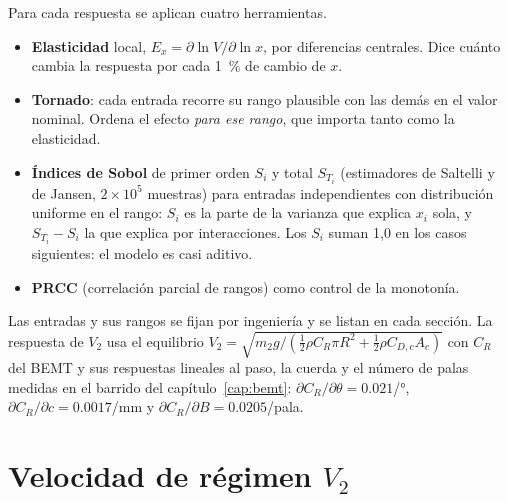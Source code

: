 Para cada respuesta se aplican cuatro herramientas.
\begin{itemize}[leftmargin=*]
  \item \textbf{Elasticidad} local, $E_x=\partial\ln V/\partial\ln x$, por diferencias
        centrales. Dice cuánto cambia la respuesta por cada \SI{1}{\percent} de cambio de $x$.
  \item \textbf{Tornado}: cada entrada recorre su rango plausible con las demás en el valor
        nominal. Ordena el efecto \emph{para ese rango}, que importa tanto como la
        elasticidad.
  \item \textbf{Índices de Sobol} de primer orden $S_i$ y total $S_{T_i}$ (estimadores de
        Saltelli y de Jansen, $2\times10^5$ muestras) para entradas independientes con distribución
        uniforme en el rango: $S_i$ es la parte de la varianza que explica $x_i$ sola, y
        $S_{T_i}-S_i$ la que explica por interacciones. Los $S_i$ suman 1,0 en los casos
        siguientes: el modelo es casi aditivo.
  \item \textbf{PRCC} (correlación parcial de rangos) como control de la monotonía.
\end{itemize}
Las entradas y sus rangos se fijan por ingeniería y se listan en cada sección. La
respuesta de $V_2$ usa el equilibrio $V_2=\sqrt{m_2g/(\tfrac12\rho C_R\pi R^2+\tfrac12\rho C_{D,c}A_c)}$
con $C_R$ del BEMT y sus respuestas lineales al paso, la cuerda y el número de palas medidas en el
barrido del capítulo~\ref{cap:bemt}: $\partial C_R/\partial\theta=\num{0.021}$/\si{\degree},
$\partial C_R/\partial c=\num{0.0017}$/mm y $\partial C_R/\partial B=\num{0.0205}$/pala.

\section{Velocidad de régimen $V_2$}\label{sec:sens-V2}

